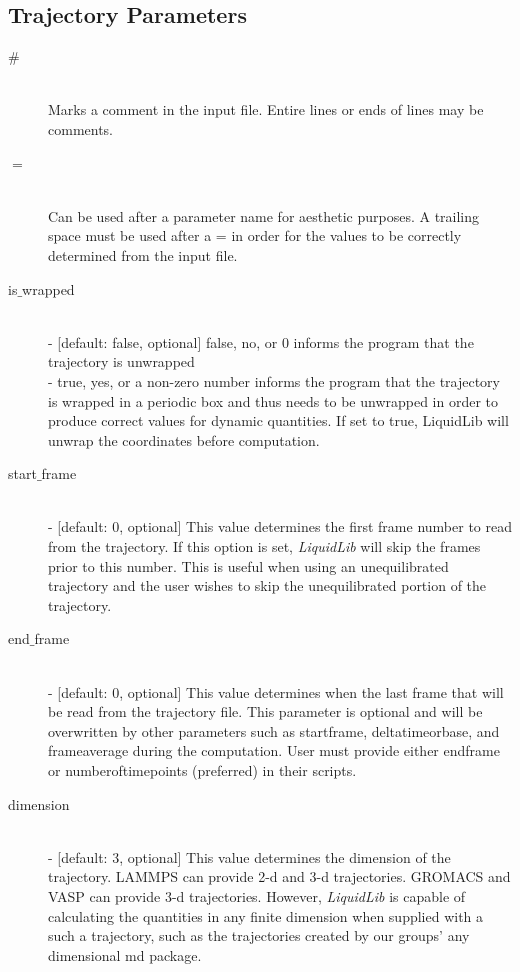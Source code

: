 \documentclass{article}
\begin{document}
\subsection{Trajectory Parameters} \label{sec::general_parameters}
\begin{description}
	\item[$\#$] \hfill \\
	Marks a comment in the input file.  Entire lines or ends of lines may be comments.
	
	\item[$=$] \hfill \\
	Can be used after a parameter name for aesthetic purposes.  A trailing space must be used after a = in order for the values to be correctly determined from the input file.
	
	\item[is$\_$wrapped] \hfill \\
	- [default: false, optional] false, no, or 0 informs the program that the trajectory is unwrapped\\
	- true, yes, or a non-zero number informs the program that the trajectory is wrapped in a periodic box and thus needs to be unwrapped in order to produce correct values for dynamic quantities.  If set to true, LiquidLib will unwrap the coordinates before computation.
	
	\item[start$\_$frame] \hfill \\
	- [default: 0, optional] This value determines the first frame number to read from the trajectory.  If this option is set, \textit{LiquidLib} will skip the frames prior to this number.  This is useful when using an unequilibrated trajectory and the user wishes to skip the unequilibrated portion of the trajectory.
	
	\item[end$\_$frame] \hfill \\
	- [default: 0, optional] This value determines when the last frame that will be read from the trajectory file.  This parameter is optional and will be overwritten by other parameters such as startframe, deltatimeorbase, and frameaverage during the computation.  User must provide either endframe or numberoftimepoints (preferred) in their scripts.
	
	\item[dimension] \hfill \\
	- [default: 3, optional] This value determines the dimension of the trajectory.  LAMMPS can provide 2-d and 3-d trajectories.  GROMACS and VASP can provide 3-d trajectories.  However, \textit{LiquidLib} is capable of calculating the quantities in any finite dimension when supplied with a such a trajectory, such as the trajectories created by our groups' any dimensional md package. 
	

\end{description}
\end{document}
